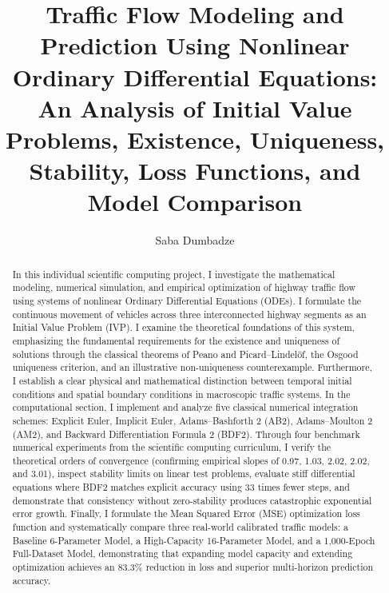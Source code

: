 \documentclass[runningheads]{llncs}
\begin{document}
\title{Traffic Flow Modeling and Prediction Using Nonlinear Ordinary Differential Equations: An Analysis of Initial Value Problems, Existence, Uniqueness, Stability, Loss Functions, and Model Comparison}


\author{Saba Dumbadze}



\maketitle

\begin{abstract}
In this individual scientific computing project, I investigate the mathematical modeling, numerical simulation, and empirical optimization of highway traffic flow using systems of nonlinear Ordinary Differential Equations (ODEs). I formulate the continuous movement of vehicles across three interconnected highway segments as an Initial Value Problem (IVP). I examine the theoretical foundations of this system, emphasizing the fundamental requirements for the existence and uniqueness of solutions through the classical theorems of Peano and Picard--Lindel\"of, the Osgood uniqueness criterion, and an illustrative non-uniqueness counterexample. Furthermore, I establish a clear physical and mathematical distinction between temporal initial conditions and spatial boundary conditions in macroscopic traffic systems. In the computational section, I implement and analyze five classical numerical integration schemes: Explicit Euler, Implicit Euler, Adams--Bashforth 2 (AB2), Adams--Moulton 2 (AM2), and Backward Differentiation Formula 2 (BDF2). Through four benchmark numerical experiments from the scientific computing curriculum, I verify the theoretical orders of convergence (confirming empirical slopes of 0.97, 1.03, 2.02, 2.02, and 3.01), inspect stability limits on linear test problems, evaluate stiff differential equations where BDF2 matches explicit accuracy using 33 times fewer steps, and demonstrate that consistency without zero-stability produces catastrophic exponential error growth. Finally, I formulate the Mean Squared Error (MSE) optimization loss function and systematically compare three real-world calibrated traffic models: a Baseline 6-Parameter Model, a High-Capacity 16-Parameter Model, and a 1,000-Epoch Full-Dataset Model, demonstrating that expanding model capacity and extending optimization achieves an 83.3\% reduction in loss and superior multi-horizon prediction accuracy.
\end{abstract}
\end{document}
